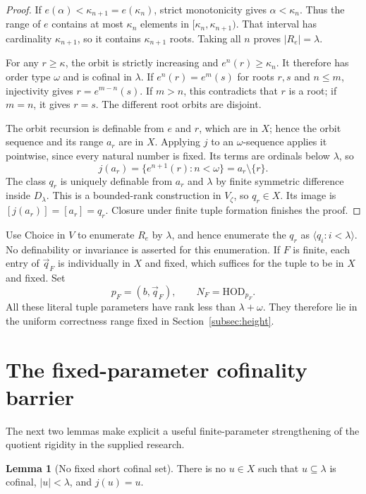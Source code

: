 \documentclass[11pt,letterpaper]{article}
\theoremstyle{definition}
\newtheorem{lemma}[definition]{Lemma}
\numberwithin{equation}{section}
\newcommand{\HOD}{\mathrm{HOD}}
\begin{document}
\begin{proof}
If $e(\alpha)<\kappa_{n+1}=e(\kappa_n)$, strict monotonicity gives $\alpha<\kappa_n$. Thus the range of $e$ contains at most $\kappa_n$ elements in $[\kappa_n,\kappa_{n+1})$. That interval has cardinality $\kappa_{n+1}$, so it contains $\kappa_{n+1}$ roots. Taking all $n$ proves $|R_e|=\lambda$.

For any $r\geq\kappa$, the orbit is strictly increasing and $e^n(r)\geq\kappa_n$. It therefore has order type $\omega$ and is cofinal in $\lambda$. If $e^n(r)=e^m(s)$ for roots $r,s$ and $n\leq m$, injectivity gives $r=e^{m-n}(s)$. If $m>n$, this contradicts that $r$ is a root; if $m=n$, it gives $r=s$. The different root orbits are disjoint.

The orbit recursion is definable from $e$ and $r$, which are in $X$; hence the orbit sequence and its range $a_r$ are in $X$. Applying $j$ to an $\omega$-sequence applies it pointwise, since every natural number is fixed. Its terms are ordinals below $\lambda$, so
\[
j(a_r)=\{e^{n+1}(r):n<\omega\}=a_r\setminus\{r\}.
\]
The class $q_r$ is uniquely definable from $a_r$ and $\lambda$ by finite symmetric difference inside $D_\lambda$. This is a bounded-rank construction in $V_\zeta$, so $q_r\in X$. Its image is $[j(a_r)]=[a_r]=q_r$. Closure under finite tuple formation finishes the proof.
\end{proof}

Use Choice in $V$ to enumerate $R_e$ by $\lambda$, and hence enumerate the $q_r$ as $\langle q_i:i<\lambda\rangle$. No definability or invariance is asserted for this enumeration. If $F$ is finite, each entry of $\vec q_F$ is individually in $X$ and fixed, which suffices for the tuple to be in $X$ and fixed. Set
\begin{equation}\label{eq:pF}
p_F=(b,\vec q_F),\qquad N_F=\HOD_{p_F}.
\end{equation}
All these literal tuple parameters have rank less than $\lambda+\omega$. They therefore lie in the uniform correctness range fixed in Section~\ref{subsec:height}.

\section{The fixed-parameter cofinality barrier}\label{sec:regular}

The next two lemmas make explicit a useful finite-parameter strengthening of the quotient rigidity in the supplied research.

\begin{lemma}[No fixed short cofinal set]\label{lem:nofixed}
There is no $u\in X$ such that $u\subseteq\lambda$ is cofinal, $|u|<\lambda$, and $j(u)=u$.
\end{lemma}
\end{document}
